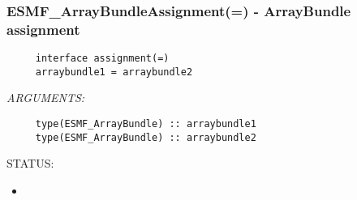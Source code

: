  
\setlength{\oldparskip}{\parskip}
\setlength{\parskip}{1.5ex}
\setlength{\oldparindent}{\parindent}
\setlength{\parindent}{0pt}
\setlength{\oldbaselineskip}{\baselineskip}
\setlength{\baselineskip}{11pt}
 
\def\bv{\begin{verbatim}}
\def\ev{\end{verbatim}}
\def\be{\begin{equation}}
\def\ee{\end{equation}}
\def\bea{\begin{eqnarray}}
\def\eea{\end{eqnarray}}
\def\bi{\begin{itemize}}
\def\ei{\end{itemize}}
\def\bn{\begin{enumerate}}
\def\en{\end{enumerate}}
\def\bd{\begin{description}}
\def\ed{\end{description}}
\def\({\left (}
\def\){\right )}
\def\[{\left [}
\def\]{\right ]}
\def\<{\left  \langle}
\def\>{\right \rangle}
\def\cI{{\cal I}}
\def\diag{\mathop{\rm diag}}
\def\tr{\mathop{\rm tr}}


 
\subsubsection [ESMF\_ArrayBundleAssignment(=)] {ESMF\_ArrayBundleAssignment(=) - ArrayBundle assignment}


  
\begin{verbatim}     interface assignment(=)
     arraybundle1 = arraybundle2\end{verbatim}{\em ARGUMENTS:}
\begin{verbatim}     type(ESMF_ArrayBundle) :: arraybundle1
     type(ESMF_ArrayBundle) :: arraybundle2\end{verbatim}
{\sf STATUS:}
   \begin{itemize}
   \item{}
   \end{itemize}
  

